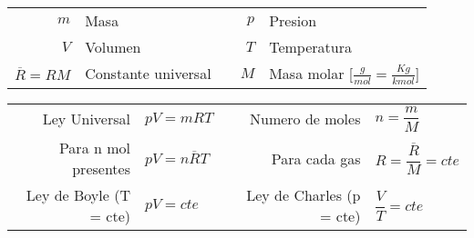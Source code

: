\documentclass[a4paper, 11pt,titlepage]{book}
\begin{document}
	\begin{tcolorbox}[title = \large\textbf{Gases ideales}]
		
		\begin{tabular}{r l c r l}
			\vspace{0.3cm} $m$ & Masa & & $p$ & Presion \\
			\vspace{0.3cm} $V$ & Volumen & & $T$ & Temperatura \\
			\vspace{0.3cm} $\overline{R} = RM$ & Constante universal & & $M$ & Masa molar [$\frac{g}{mol} = \frac{Kg}{kmol}$]\\
			
		\end{tabular}
	     
	   	\begin{center}
	     	\begin{tabular}{r | l c r | l}
	     			\vspace{0.3cm} Ley Universal & $pV = mRT$ & & Numero de moles & $n = \dfrac{m}{M}$ \\
	     			\vspace{0.3cm} Para n mol presentes & $pV = n\overline{R}T$ & & Para cada gas & $R = \dfrac{\overline{R}}{M}  = cte $  \\
	     			\vspace{.3cm} Ley de Boyle (T = cte) & $pV = cte $ && Ley de Charles (p = cte)  &  $\dfrac{V}{T} = cte $  \\
	     			
	     			
	     	\end{tabular}
	   	\end{center}
	   
	\end{tcolorbox}

\end{document}
